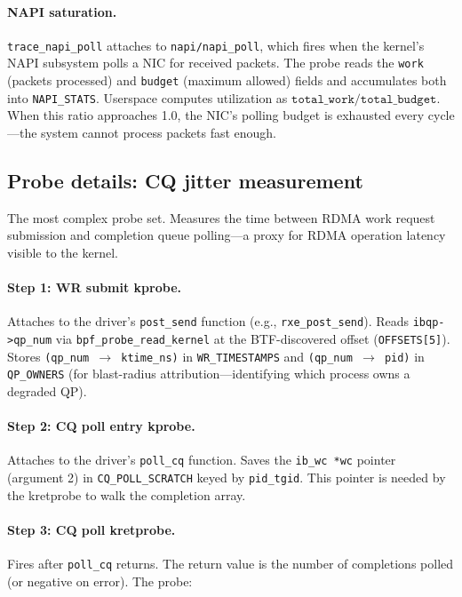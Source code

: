 \documentclass[11pt]{article}
\begin{document}
\paragraph{NAPI saturation.}
\texttt{trace\_napi\_poll} attaches to \texttt{napi/napi\_poll}, which fires
when the kernel's NAPI subsystem polls a NIC for received packets. The probe
reads the \texttt{work} (packets processed) and \texttt{budget} (maximum
allowed) fields and accumulates both into \texttt{NAPI\_STATS}. Userspace
computes utilization as $\texttt{total\_work} / \texttt{total\_budget}$.
When this ratio approaches 1.0, the NIC's polling budget is exhausted every
cycle---the system cannot process packets fast enough.

\subsection{Probe details: CQ jitter measurement}

The most complex probe set. Measures the time between RDMA work request
submission and completion queue polling---a proxy for RDMA operation latency
visible to the kernel.

\paragraph{Step 1: WR submit kprobe.}
Attaches to the driver's \texttt{post\_send} function (e.g.,
\texttt{rxe\_post\_send}). Reads \texttt{ibqp->qp\_num} via
\texttt{bpf\_probe\_read\_kernel} at the BTF-discovered offset
(\texttt{OFFSETS[5]}). Stores \texttt{(qp\_num $\rightarrow$ ktime\_ns)}
in \texttt{WR\_TIMESTAMPS} and \texttt{(qp\_num $\rightarrow$ pid)} in
\texttt{QP\_OWNERS} (for blast-radius attribution---identifying which
process owns a degraded QP).

\paragraph{Step 2: CQ poll entry kprobe.}
Attaches to the driver's \texttt{poll\_cq} function. Saves the
\texttt{ib\_wc *wc} pointer (argument 2) in \texttt{CQ\_POLL\_SCRATCH}
keyed by \texttt{pid\_tgid}. This pointer is needed by the kretprobe to
walk the completion array.

\paragraph{Step 3: CQ poll kretprobe.}
Fires after \texttt{poll\_cq} returns. The return value is the number of
completions polled (or negative on error). The probe:
\end{document}
